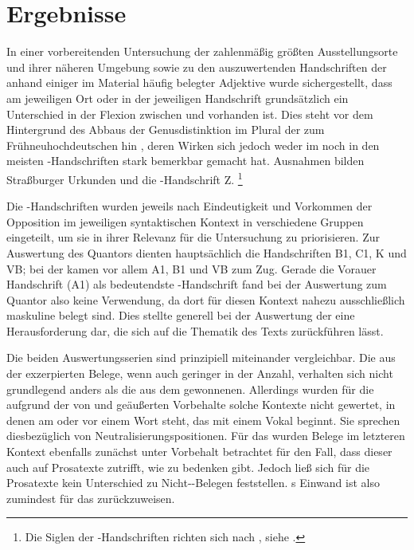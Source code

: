 \section{Ergebnisse}

In einer vorbereitenden Untersuchung der zahlenmäßig größten Ausstellungs\-orte
und ihrer näheren Umgebung sowie zu den auszuwertenden Handschriften der
\KC{} anhand einiger im Material häufig belegter Adjektive wurde
sichergestellt, dass am jeweiligen Ort oder in der jeweiligen Handschrift
grundsätzlich ein Unterschied in der Flexion zwischen  und
 vorhanden ist. Dies steht vor dem Hintergrund des Abbaus der
Genusdistinktion im Plural der
 zum Frühneuhochdeutschen hin
\autocite[191--192]{reichmannwegera1993}, deren Wirken sich jedoch weder im
\CAO{} noch in den meisten \KC-Handschriften stark bemerkbar gemacht hat.
Ausnahmen bilden Straßburger Urkunden und die \KC{}-Handschrift Z.%
%
	\footnote{Die Siglen der \KC-Handschriften richten sich nach
		, siehe .}

Die \KC{}-Handschriften wurden jeweils nach Eindeutigkeit und Vorkommen der
Opposition im jeweiligen syntaktischen Kontext in verschiedene Gruppen
eingeteilt, um sie in ihrer Relevanz für die Untersuchung zu priorisieren. Zur
Auswertung des Quantors  dienten hauptsächlich die Handschriften
B1, C1, K und VB; bei der   kamen vor allem A1, B1
und VB zum Zug. Gerade die Vorauer Handschrift (A1) als bedeutendste
\KC{}-Handschrift fand bei der Auswertung zum Quantor  also keine
Verwendung, da dort für diesen Kontext nahezu ausschließlich maskuline
 belegt sind. Dies stellte generell bei der Auswertung der
\KC{} eine Herausforderung dar, die sich auf die Thematik des Texts
zurückführen lässt.

Die beiden Auswertungsserien sind prinzipiell miteinander vergleichbar. Die aus
der \KC{} exzerpierten Belege, wenn auch geringer in der Anzahl, verhalten sich
nicht grundlegend anders als die aus dem \CAO{} gewonnenen. Allerdings wurden
für die \KC{} aufgrund der von \citet[89--90]{askedal1973} und
\citet[191]{gjelsten1980} geäußerten Vorbehalte solche Kontexte
nicht gewertet, in denen  am  oder vor einem Wort
steht, das mit einem Vokal beginnt. Sie sprechen diesbezüglich von
Neutralisierungs\-positionen. Für das \CAO{} wurden Belege im letzteren Kontext
ebenfalls zunächst unter Vorbehalt betrachtet für den Fall, dass dieser auch
auf Prosatexte zutrifft, wie \citet[92]{askedal1973} zu bedenken
gibt. Jedoch ließ sich für die Prosatexte kein Unterschied zu
Nicht-\allowbreak{}-\allowbreak{}Belegen feststellen.
\citeauthor{askedal1973}s Einwand ist also zumindest für das \CAO{}
zurückzuweisen.

